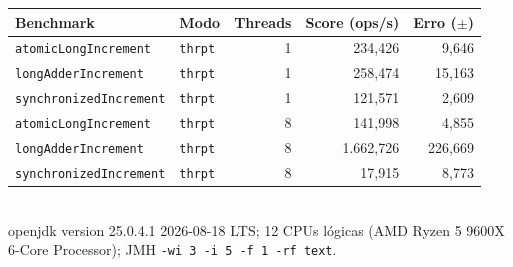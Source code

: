 \begin{tabular}{@{}llrrr@{}}
\toprule
Benchmark & Modo & Threads & Score (ops/\textmu{}s) & Erro ($\pm$) \\
\midrule
\texttt{atomicLongIncrement} & \texttt{thrpt} & 1 & 234{,}426 & 9{,}646 \\
\texttt{longAdderIncrement} & \texttt{thrpt} & 1 & 258{,}474 & 15{,}163 \\
\texttt{synchronizedIncrement} & \texttt{thrpt} & 1 & 121{,}571 & 2{,}609 \\
\addlinespace
\texttt{atomicLongIncrement} & \texttt{thrpt} & 8 & 141{,}998 & 4{,}855 \\
\texttt{longAdderIncrement} & \texttt{thrpt} & 8 & 1{.}662{,}726 & 226{,}669 \\
\texttt{synchronizedIncrement} & \texttt{thrpt} & 8 & 17{,}915 & 8{,}773 \\
\bottomrule
\end{tabular}
\\[1ex]{\footnotesize openjdk version 25.0.4.1 2026-08-18 LTS; 12 CPUs lógicas (AMD Ryzen 5 9600X 6-Core Processor); JMH \texttt{-wi 3 -i 5 -f 1 -rf text}.}
